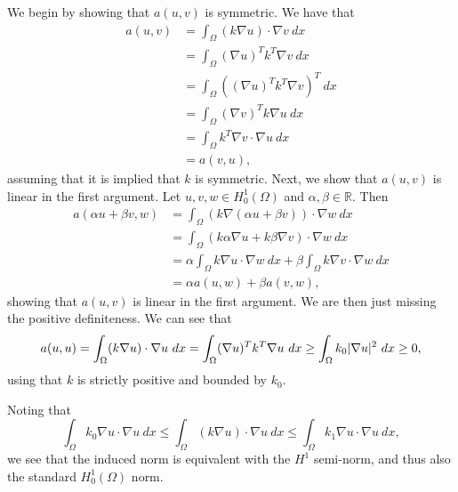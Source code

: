 \begin{solution}
    We begin by showing that $a(u, v)$ is symmetric.
    We have that
    \begin{align*}
        a(u, v)
        &= \int_\Omega (k \nabla u) \cdot \nabla v \ dx \\
        &= \int_\Omega (\nabla u)^T k^T \nabla v \ dx \\
        &= \int_\Omega \left( (\nabla u)^T k^T \nabla v \right)^T \ dx \\
        &= \int_\Omega (\nabla v)^T k \nabla u \ dx \\
        &= \int_\Omega k^T \nabla v \cdot \nabla u \ dx \\
        &= a(v, u),
    \end{align*}
    assuming that it is implied that $k$ is symmetric.
    Next, we show that $a(u, v)$ is linear in the first argument.
    Let $u, v, w \in H^1_0(\Omega)$ and $\alpha, \beta \in \mathbb{R}$.
    Then
    \begin{align*}
        a(\alpha u + \beta v, w)
        &= \int_\Omega (k \nabla (\alpha u + \beta v)) \cdot \nabla w \ dx \\
        &= \int_\Omega (k \alpha \nabla u + k \beta \nabla v) \cdot \nabla w \ dx \\
        &= \alpha \int_\Omega k \nabla u \cdot \nabla w \ dx + \beta \int_\Omega k \nabla v \cdot \nabla w \ dx \\
        &= \alpha a(u, w) + \beta a(v, w),
    \end{align*}
    showing that $a(u, v)$ is linear in the first argument.
    We are then just missing the positive definiteness.
    We can see that
    \begin{equation*}
        a(u, u) = \int_\Omega (k \nabla u) \cdot \nabla u \ dx = \int_\Omega (\nabla u)^T k^T \nabla u \ dx \geq \int_\Omega k_0 \lvert\nabla u\rvert^2 \ dx \geq 0,
    \end{equation*}
    using that $k$ is strictly positive and bounded by $k_0$.

    Noting that
    \begin{equation*}
        \int_\Omega k_0 \nabla u \cdot \nabla u \ dx
        \leq \int_\Omega (k \nabla u) \cdot \nabla u \ dx
        \leq \int_\Omega k_1 \nabla u \cdot \nabla u \ dx,
    \end{equation*}
    we see that the induced norm is equivalent with the $H^1$ semi-norm, and thus also the standard $H^1_0(\Omega)$ norm.
\end{solution}

